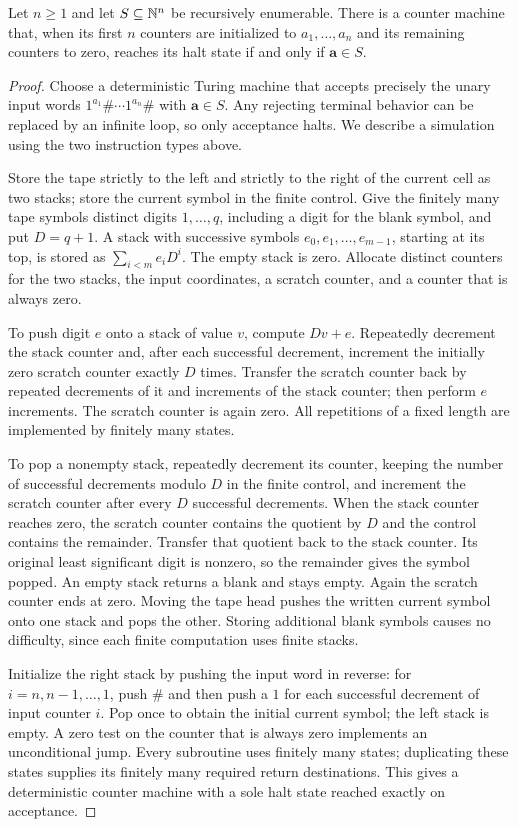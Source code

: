 \begin{lemma}\label{lem:counter-universality}
Let $n\geq 1$ and let $S\subseteq\mathbb N^n$ be recursively enumerable. There
is a counter machine that, when its first $n$ counters are initialized to
$a_1,\ldots,a_n$ and its remaining counters to zero, reaches its halt state
if and only if $\mathbf a\in S$.
\end{lemma}

\begin{proof}
Choose a deterministic Turing machine that accepts precisely the unary
input words
$1^{a_1}\#\cdots1^{a_n}\#$ with $\mathbf a\in S$. Any rejecting terminal
behavior can be replaced by an infinite loop, so only acceptance halts.
We describe a simulation using the two instruction types above.

Store the tape strictly to the left and strictly to the right of the
current cell as two stacks; store the current symbol in the finite
control. Give the finitely many tape symbols distinct digits
$1,\ldots,q$, including a digit for the blank symbol, and put $D=q+1$.
A stack with successive symbols $e_0,e_1,\ldots,e_{m-1}$, starting at its
top, is stored as $\sum_{i<m}e_iD^i$. The empty stack is zero.
Allocate distinct counters for the two stacks, the input coordinates,
a scratch counter, and a counter that is always zero.

To push digit $e$ onto a stack of value $v$, compute $Dv+e$.
Repeatedly decrement the stack counter and, after each successful
decrement, increment the initially zero scratch counter exactly $D$
times. Transfer the scratch counter back by repeated decrements of it
and increments of the stack counter; then perform $e$ increments.
The scratch counter is again zero. All repetitions of a fixed length
are implemented by finitely many states.

To pop a nonempty stack, repeatedly decrement its counter, keeping the
number of successful decrements modulo $D$ in the finite control, and
increment the scratch counter after every $D$ successful decrements.
When the stack counter reaches zero, the scratch counter contains the
quotient by $D$ and the control contains the remainder. Transfer that
quotient back to the stack counter. Its original least significant
digit is nonzero, so the remainder gives the symbol popped. An empty
stack returns a blank and stays empty. Again the scratch counter ends
at zero. Moving the tape head pushes the written current symbol onto
one stack and pops the other. Storing additional blank symbols causes
no difficulty, since each finite computation uses finite stacks.

Initialize the right stack by pushing the input word in reverse: for
$i=n,n-1,\ldots,1$, push $\#$ and then push a $1$ for each successful
decrement of input counter $i$. Pop once to obtain the initial current
symbol; the left stack is empty. A zero test on the counter that is
always zero implements an unconditional jump. Every subroutine uses
finitely many states; duplicating these states supplies its finitely
many required return destinations. This gives a deterministic counter
machine with a sole halt state reached exactly on acceptance.
\end{proof}

